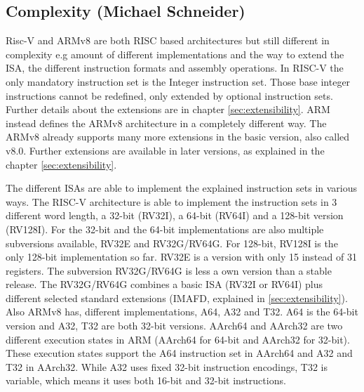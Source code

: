 \documentclass[conference]{IEEEtran}
\begin{document}
	\subsection{Complexity (Michael Schneider)}
	\label{complexity}
	Risc-V and ARMv8 are both \gls{RISC} based architectures but still different in complexity e.g amount of different implementations and the way to extend the \gls{ISA}, the different instruction formats and assembly operations.
	In RISC-V the only mandatory instruction set is the Integer instruction set. Those base integer instructions cannot be redefined, only extended by optional instruction sets. \cite{Waterman2017} Further details about the extensions are in chapter \ref{sec:extensibility}.
	ARM instead defines the ARMv8 architecture in a completely different way. The ARMv8 already supports many more extensions in the basic version, also called v8.0. Further extensions are available in later versions, as explained in the chapter \ref{sec:extensibility}. \cite{Arm2020} 	

	The different \glspl{ISA} are able to implement the explained instruction sets in various ways.
	The RISC-V architecture is able to implement the instruction sets in 3 different word length, a 32-bit (RV32I), a 64-bit (RV64I) and a 128-bit version (RV128I).
	For the 32-bit and the 64-bit implementations are also multiple subversions available, RV32E and RV32G/RV64G. For 128-bit, RV128I is the only 128-bit implementation so far. RV32E is a version with only 15 instead of 31 registers. The subversion RV32G/RV64G is less a own version than a stable release. The RV32G/RV64G combines a basic \gls{ISA} (RV32I or RV64I) plus different selected standard extensions (IMAFD, explained in \ref{sec:extensibility}). \cite{Waterman2016} 
	Also ARMv8 has, different implementations,
	A64, A32 and T32. A64 is the 64-bit version and A32, T32  are both 32-bit versions.
	AArch64 and AArch32 are two different execution states in ARM (AArch64 for 64-bit and AArch32 for 32-bit). These execution states support the A64 instruction set in AArch64 and A32 and T32 in AArch32. While A32 uses fixed 32-bit instruction encodings, T32 is variable, which means it uses both 16-bit and 32-bit instructions. \cite{Arm2020}
	
\end{document}
